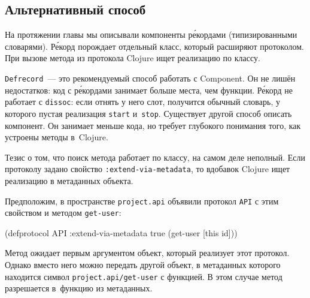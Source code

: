 \fi

\subsection{Альтернативный способ}

На протяжении главы мы описывали компоненты р\'{е}кордами (типизированными
словарями). Р\'{е}корд порождает отдельный класс, который расширяют
протоколом. При вызове метода из протокола Clojure ищет реализацию по классу.


\verb|Defrecord|~--- это рекомендуемый способ работать с Component. Он не лишён
недостатков: код с р\'{е}кордами занимает больше места, чем функции. Р\'{е}корд
не работает с \verb|dissoc|: если отнять у него слот, получится обычный словарь,
у которого пустая реализация \verb|start| и~\verb|stop|. Существует другой
способ описать компонент. Он занимает меньше кода, но требует глубокого
понимания того, как устроены методы в~Clojure.

Тезис о том, что поиск метода работает по классу, на самом деле неполный. Если
протоколу задано свойство \texttt{:extend\--via\--meta\-data}, то вдобавок Clojure ищет
реализацию в метаданных объекта.

Предположим, в пространстве \verb|project.api| объявили протокол \verb|API| с
этим свойством и методом \verb|get-user|:

\begin{english}
  \begin{clojure}
(defprotocol API
  :extend-via-metadata true
  (get-user [this id]))
  \end{clojure}
\end{english}

Метод ожидает первым аргументом объект, который реализует этот протокол. Однако
вместо него можно передать другой объект, в метаданных которого находится символ
\verb|project.api/get-user| с функцией. В этом случае метод разрешается
в~функцию из метаданных.

\begin{english}
\end{english}

